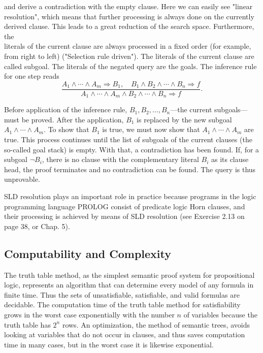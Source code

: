 \documentclass[10pt]{book}
\begin{document}
and derive a contradiction with the empty clause. Here we can easily see "linear resolution", which means that further processing is always done on the currently derived clause. This leads to a great reduction of the search space. Furthermore, the\\
literals of the current clause are always processed in a fixed order (for example, from right to left) ("Selection rule driven"). The literals of the current clause are called subgoal. The literals of the negated query are the goals. The inference rule for one step reads
$$
\frac{A_{1} \wedge \cdots \wedge A_{m} \Rightarrow B_{1}, \quad B_{1} \wedge B_{2} \wedge \cdots \wedge B_{n} \Rightarrow f}{A_{1} \wedge \cdots \wedge A_{m} \wedge B_{2} \wedge \cdots \wedge B_{n} \Rightarrow f} .
$$

Before application of the inference rule, $B_{1}, B_{2}, \ldots, B_{n}$---the current subgoals---must be proved. After the application, $B_{1}$ is replaced by the new subgoal $A_{1} \wedge \cdots \wedge A_{m}$. To show that $B_{1}$ is true, we must now show that $A_{1} \wedge \cdots \wedge A_{m}$ are true. This process continues until the list of subgoals of the current clauses (the so-called goal stack) is empty. With that, a contradiction has been found. If, for a subgoal $\neg B_{i}$, there is no clause with the complementary literal $B_{i}$ as its clause head, the proof terminates and no contradiction can be found. The query is thus unprovable.

SLD resolution plays an important role in practice because programs in the logic programming language PROLOG consist of predicate logic Horn clauses, and their processing is achieved by means of SLD resolution (see Exercise 2.13 on page 38, or Chap. 5).

\subsection{Computability and Complexity}
The truth table method, as the simplest semantic proof system for propositional logic, represents an algorithm that can determine every model of any formula in finite time. Thus the sets of unsatisfiable, satisfiable, and valid formulas are decidable. The computation time of the truth table method for satisfiability grows in the worst case exponentially with the number $n$ of variables because the truth table has $2^{n}$ rows. An optimization, the method of semantic trees, avoids looking at variables that do not occur in clauses, and thus saves computation time in many cases, but in the worst case it is likewise exponential.
\end{document}
